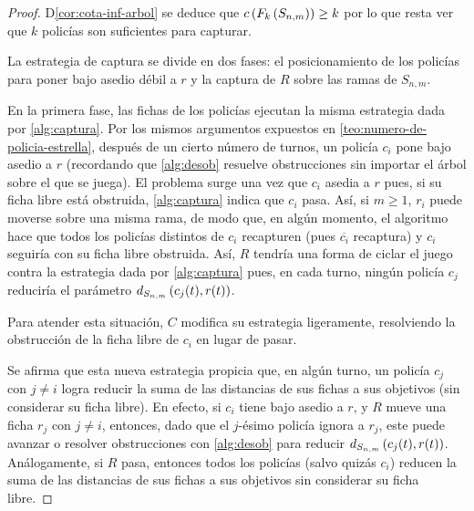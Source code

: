 \begin{proof}
    D\cref{cor:cota-inf-arbol} se deduce que $c\left( F_{k}\left( S_{n,m}\right)\right)\geq k$ por
    lo que resta ver que $k$ polic\'ias son suficientes para capturar.

    La estrategia de captura se divide en dos fases: el posicionamiento de los
    polic\'ias para poner bajo asedio d\'ebil a $r$ y la captura de $R$ sobre
    las ramas de $S_{n,m}$.

    En la primera fase, las fichas de los polic\'ias ejecutan la misma
    estrategia dada por \cref{alg:captura}. Por los mismos argumentos expuestos
    en \cref{teo:numero-de-policia-estrella}, despu\'es de un cierto n\'umero de
    turnos, un polic\'ia $c_i$ pone bajo asedio a $r$ (recordando que
    \cref{alg:desob} resuelve obstrucciones sin importar el \'arbol sobre el que
    se juega). El problema surge una vez que $c_i$ asedia a $r$ pues, si su
    ficha libre est\'a obstruida, \cref{alg:captura} indica que $c_i$ pasa.
    As\'i, si $m\geq 1$, $r_i$ puede moverse sobre una misma rama, de modo que,
    en alg\'un momento, el algoritmo hace que todos los polic\'ias distintos de
    $c_i$ recapturen (pues $\overline{c_i}$ recaptura) y $c_i$ seguir\'ia con su
    ficha libre obstruida. As\'i, $R$ tendr\'ia una forma de ciclar el juego
    contra la estrategia dada por \cref{alg:captura} pues, en cada turno,
    ning\'un polic\'ia $c_j$ reducir\'ia el par\'ametro
    $d_{S_{n,m}}\left( c_j(t),r(t)\right)$.

    Para atender esta situaci\'on, $C$ modifica su estrategia ligeramente,
    resolviendo la obstrucci\'on de la ficha libre de $c_i$ en lugar de pasar.
    
    Se afirma que esta nueva estrategia propicia que, en alg\'un turno, un
    polic\'ia $c_j$ con $j\neq i$ logra reducir la suma de las distancias de sus
    fichas a sus objetivos (sin considerar su ficha libre). En efecto, si $c_i$
    tiene bajo asedio a $r$, y $R$ mueve una ficha $r_j$ con $j\neq i$,
    entonces, dado que el $j$-\'esimo polic\'ia ignora a $r_j$, este puede
    avanzar o resolver obstrucciones con \cref{alg:desob} para reducir
    $d_{S_{n,m}}\left( c_j(t),r(t)\right)$. An\'alogamente, si $R$ pasa, entonces
    todos los polic\'ias (salvo quiz\'as $c_i$) reducen la suma de las
    distancias de sus fichas a sus objetivos sin considerar su ficha libre.
    

\end{proof}

